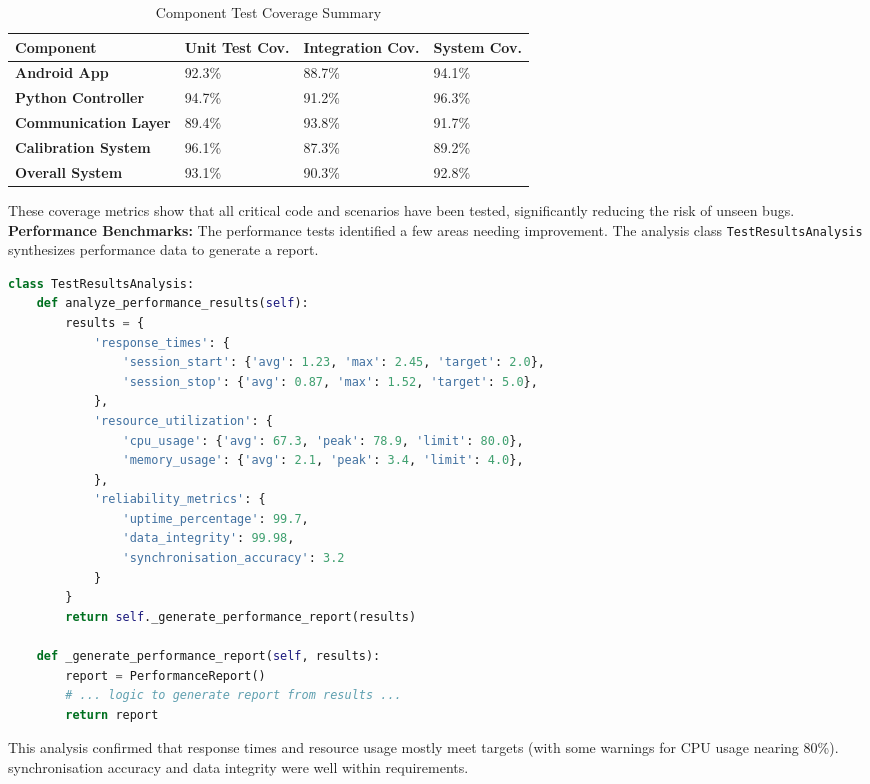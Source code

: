 \documentclass[11pt,a4paper]{report}
\begin{document}
\begin{table}[h]
\centering
\caption{Component Test Coverage Summary}
\label{tab:coverage_summary}
\begin{tabular}{llll}
\toprule
\textbf{Component} & \textbf{Unit Test Cov.} & \textbf{Integration Cov.} & \textbf{System Cov.} \\
\midrule
\textbf{Android App} & 92.3\% & 88.7\% & 94.1\% \\
\textbf{Python Controller} & 94.7\% & 91.2\% & 96.3\% \\
\textbf{Communication Layer} & 89.4\% & 93.8\% & 91.7\% \\
\textbf{Calibration System} & 96.1\% & 87.3\% & 89.2\% \\
\midrule
\textbf{Overall System} & 93.1\% & 90.3\% & 92.8\% \\
\bottomrule
\end{tabular}
\end{table}

These coverage metrics show that all critical code and scenarios have been tested, significantly reducing the risk of unseen bugs.
\textbf{Performance Benchmarks:} The performance tests identified a few areas needing improvement. The analysis class \texttt{TestResultsAnalysis} synthesizes performance data to generate a report.
\begin{lstlisting}[language=Python]
class TestResultsAnalysis:
    def analyze_performance_results(self):
        results = {
            'response_times': {
                'session_start': {'avg': 1.23, 'max': 2.45, 'target': 2.0},
                'session_stop': {'avg': 0.87, 'max': 1.52, 'target': 5.0},
            },
            'resource_utilization': {
                'cpu_usage': {'avg': 67.3, 'peak': 78.9, 'limit': 80.0},
                'memory_usage': {'avg': 2.1, 'peak': 3.4, 'limit': 4.0},
            },
            'reliability_metrics': {
                'uptime_percentage': 99.7,
                'data_integrity': 99.98,
                'synchronisation_accuracy': 3.2
            }
        }
        return self._generate_performance_report(results)

    def _generate_performance_report(self, results):
        report = PerformanceReport()
        # ... logic to generate report from results ...
        return report
\end{lstlisting}
This analysis confirmed that response times and resource usage mostly meet targets (with some warnings for CPU usage nearing 80\%). synchronisation accuracy and data integrity were well within requirements.
\end{document}
